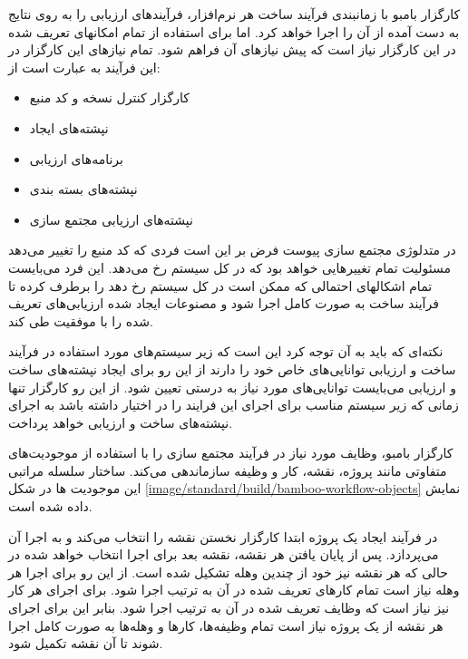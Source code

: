 کارگزار بامبو با زمانبندی فرآیند ساخت هر نرم‌افزار، فرآیندهای ارزیابی را به روی
نتایج به دست آمده از آن را اجرا خواهد کرد. اما برای استفاده از تمام امکانهای
تعریف شده در این کارگزار نیاز است که پیش نیازهای آن فراهم شود. تمام نیازهای این
کارگزار در این فرآیند به عبارت است از:

\begin{itemize}
  \item کارگزار کنترل نسخه و کد منبع
  \item نپشته‌های ایجاد
  \item برنامه‌های ارزیابی
  \item نپشته‌های بسته بندی
  \item نپشته‌های ارزیابی مجتمع سازی
\end{itemize}

در متدلوژی مجتمع سازی پیوست فرض بر این است فردی که کد منبع را تغییر می‌دهد
مسئولیت تمام تغییرهایی خواهد بود که در کل سیستم رخ می‌دهد. این فرد می‌بایست تمام
اشکالهای احتمالی که ممکن است در کل سیستم رخ دهد را برطرف کرده تا فرآیند ساخت به
صورت کامل اجرا شود و مصنوعات ایجاد شده ارزیابی‌های تعریف شده را با موفقیت طی
کند.

نکته‌ای که باید به آن توجه کرد این است که زیر سیستم‌های مورد استفاده در فرآیند
ساخت و ارزیابی توانایی‌های خاص خود را دارند از این رو برای ایجاد نپشته‌های ساخت
و ارزیابی می‌بایست توانایی‌های مورد نیاز به درستی تعیین شود. از این رو کارگزار
تنها زمانی که زیر سیستم مناسب برای اجرای این فرایند را در اختیار داشته باشد به
اجرای نپشته‌های ساخت و ارزیابی خواهد پرداخت.


کارگزار بامبو، وظایف مورد نیاز در فرآیند مجتمع سازی را با استفاده از موجودیت‌های
متفاوتی مانند پروژه، نقشه، کار و وظیفه سازماندهی می‌کند. ساختار سلسله مراتبی این
موجودیت ها در شکل \ref{image/standard/build/bamboo-workflow-objects} نمایش داده
شده است.

در فرآیند ایجاد یک پروژه ابتدا کارگزار نخستن نقشه را انتخاب می‌کند و به اجرا آن
می‌پردازد. پس از پایان یافتن هر نقشه، نقشه بعد برای اجرا انتخاب خواهد شده در
حالی که هر نقشه نیز خود از چندین وهله تشکیل شده است. از این رو برای اجرا هر وهله
نیاز است تمام کارهای تعریف شده در آن به ترتیب اجرا شود. برای اجرای هر کار نیز
نیاز است که وظایف تعریف شده در آن به ترتیب اجرا شود. بنابر این برای اجرای هر
نقشه از یک پروژه نیاز است تمام وظیفه‌ها، کارها و وهله‌ها به صورت کامل اجرا شوند
تا آن نقشه تکمیل شود.


